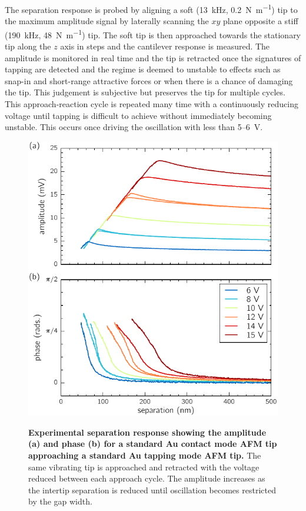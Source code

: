 \documentclass{article}
\begin{document}
The separation response is probed by aligning a soft (\SI{13}{kHz}, \SI{0.2}{N\per\metre}) tip to the maximum amplitude signal by laterally scanning the $xy$ plane opposite a stiff (\SI{190}{kHz}, \SI{48}{N\per\metre}) tip. The soft tip is then approached towards the stationary tip along the $z$ axis in  steps and the cantilever response is measured. The amplitude is monitored in real time and the tip is retracted once the signatures of tapping are detected and the regime is deemed to unstable to effects such as snap-in and short-range attractive forces or when there is a chance of damaging the tip. This judgement is subjective but preserves the tip for multiple cycles. This approach-reaction cycle is repeated many time with a continuously reducing voltage until tapping is difficult to achieve without immediately becoming unstable. This occurs once driving the oscillation with less than 5--\SI{6}{V}.

\begin{figure}[h]
\centering
{\includegraphics{figures/exp_separation_response}}
{\caption[Experimental separation response showing the amplitude (a) and phase (b) for a standard Au contact mode AFM tip approaching a standard Au tapping mode AFM tip]{\textbf{Experimental separation response showing the amplitude (a) and phase (b) for a standard Au contact mode AFM tip approaching a standard Au tapping mode AFM tip.} The same vibrating tip is approached and retracted with the voltage reduced between each approach cycle. The amplitude increases as the intertip separation is reduced until oscillation becomes restricted by the gap width.}
\label{fig:exp_sep_resp}}
\end{figure}
\end{document}
